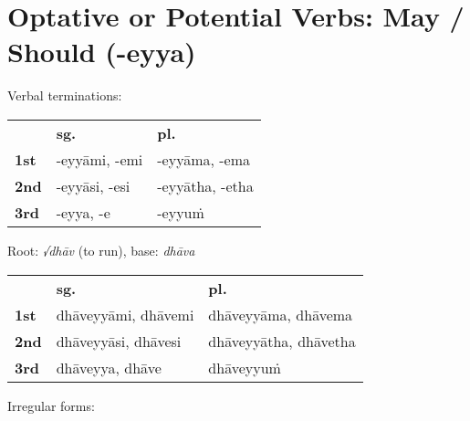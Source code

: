 \documentclass[11pt,oneside]{memoir}
\begin{document}
\normalArrayStrech

\clearpage

\section{Optative or Potential Verbs: May / Should (-eyya)}
\label{sec:org7f967ee}

{\centering\par
\begin{multicols}{2}

Verbal terminations:

\begin{center}
\begin{tabular}{lll}
 & \textbf{sg.} & \textbf{pl.}\\[0pt]
\textbf{1st} & -eyyāmi, -emi & -eyyāma, -ema\\[0pt]
\textbf{2nd} & -eyyāsi, -esi & -eyyātha, -etha\\[0pt]
\textbf{3rd} & -eyya, -e & -eyyuṁ\\[0pt]
\end{tabular}
\end{center}

\columnbreak

Root: \emph{√dhāv} (to run), base: \emph{dhāva}

\begin{center}
\begin{tabular}{lll}
 & \textbf{sg.} & \textbf{pl.}\\[0pt]
\textbf{1st} & dhāveyyāmi, dhāvemi & dhāveyyāma, dhāvema\\[0pt]
\textbf{2nd} & dhāveyyāsi, dhāvesi & dhāveyyātha, dhāvetha\\[0pt]
\textbf{3rd} & dhāveyya, dhāve & dhāveyyuṁ\\[0pt]
\end{tabular}
\end{center}

\end{multicols}
\par}

Irregular forms:
\end{document}
